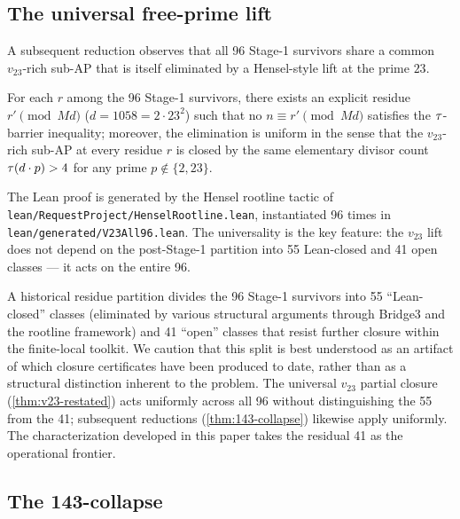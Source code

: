 \subsection{The universal free-prime lift}
\label{sec:v23-universal}

A subsequent reduction observes that all 96 Stage-1 survivors share
a common $v_{23}$-rich sub-AP that is itself eliminated by a
Hensel-style lift at the prime $23$.

\begin{theorem}
\label{thm:v23-restated}
For each $r$ among the 96 Stage-1 survivors, there exists an
explicit residue $r' \pmod{Md}$ ($d = 1058 = 2 \cdot 23^2$) such that
no $n \equiv r' \pmod{Md}$ satisfies the $\tau$-barrier inequality;
moreover, the elimination is uniform in the sense that the
$v_{23}$-rich sub-AP at every residue $r$ is closed by the same
elementary divisor count $\tau(d \cdot p) > 4$ for any prime
$p \notin \{2, 23\}$.
\end{theorem}

The Lean proof is generated by the Hensel rootline tactic of
\texttt{lean/RequestProject/HenselRootline.lean}, instantiated 96
times in \texttt{lean/generated/V23All96.lean}. The universality is
the key feature: the $v_{23}$ lift does not depend on the
post-Stage-1 partition into 55 Lean-closed and 41 open classes ---
it acts on the entire 96.

\begin{remark}
\label{rem:5541-not-structural}
A historical residue partition divides the 96 Stage-1 survivors into
55 ``Lean-closed'' classes (eliminated by various structural
arguments through Bridge3 and the rootline framework) and 41
``open'' classes that resist further closure within the
finite-local toolkit. We caution that this split is best understood
as an artifact of which closure certificates have been produced to
date, rather than as a structural distinction inherent to the
problem. The universal $v_{23}$ partial closure
(\cref{thm:v23-restated}) acts uniformly across all 96 without
distinguishing the 55 from the 41; subsequent reductions
(\cref{thm:143-collapse}) likewise apply uniformly. The
characterization developed in this paper takes the residual 41 as
the operational frontier.
\end{remark}

\subsection{The 143-collapse}
\label{sec:143-collapse}

